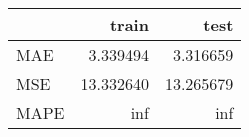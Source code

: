 \begin{tabular}{lrr}
\toprule
{} &      train &       test \\
\midrule
MAE  &   3.339494 &   3.316659 \\
MSE  &  13.332640 &  13.265679 \\
MAPE &        inf &        inf \\
\bottomrule
\end{tabular}
